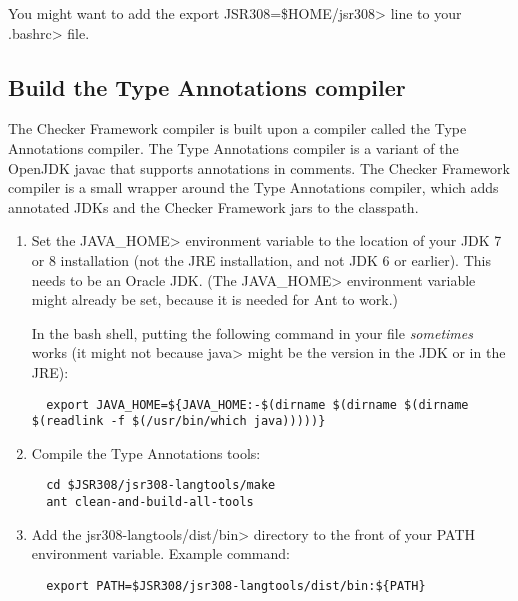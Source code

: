 You might want to add the \<export JSR308=\$HOME/jsr308> line to your
\<.bashrc> file.


\subsection{Build the Type Annotations compiler\label{building-compiler}}

The Checker Framework compiler is built upon a compiler called the Type
Annotations compiler.  The Type Annotations compiler is a variant of the
OpenJDK javac that supports annotations in comments.  The Checker Framework
compiler is a small wrapper around the Type Annotations compiler, which
adds annotated JDKs and the Checker Framework jars to the classpath.


\begin{enumerate}
\item
Set the \<JAVA\_HOME> environment variable to the location of your JDK
7 or 8 installation (not the JRE installation, and not JDK 6 or earlier).
This needs to be an Oracle JDK.
(The \<JAVA\_HOME> environment
variable might already be set, because it is needed for Ant to work.)

In the bash shell, putting the following command in your  file
\emph{sometimes} works (it might
not because \<java> might be the version in the JDK or in the JRE):
\begin{smaller}
\begin{Verbatim}
  export JAVA_HOME=${JAVA_HOME:-$(dirname $(dirname $(dirname $(readlink -f $(/usr/bin/which java)))))}
\end{Verbatim}
\end{smaller}

\item
Compile the Type Annotations tools:

\begin{Verbatim}
  cd $JSR308/jsr308-langtools/make
  ant clean-and-build-all-tools
\end{Verbatim}

\item
 Add the \<jsr308-langtools/dist/bin> directory to the front of your PATH environment variable.
  Example command:

\begin{Verbatim}
  export PATH=$JSR308/jsr308-langtools/dist/bin:${PATH}
\end{Verbatim}

\end{enumerate}

